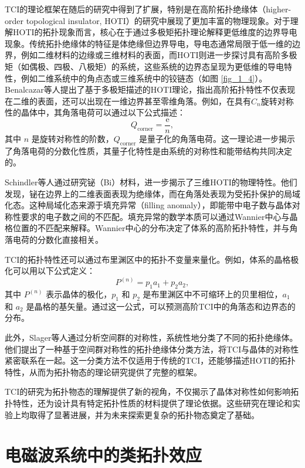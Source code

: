TCI的理论框架在随后的研究中得到了扩展，特别是在高阶拓扑绝缘体（higher-order topological insulator, HOTI）的研究中展现了更加丰富的物理现象\cite{f3}。对于理解HOTI的拓扑现象而言，核心在于通过多极矩拓扑理论解释更低维度的边界导电现象。传统拓扑绝缘体的特征是体绝缘但边界导电，导电态通常局限于低一维的边界，例如二维材料的边缘或三维材料的表面，而HOTI则进一步探讨具有高阶多极矩（如偶极、四极、八极矩）的系统，这些系统的边界态呈现为更低维的导电特性，例如二维系统中的角点态或三维系统中的铰链态（如图 \ref{fig_1_4}）。Benalcazar等人提出了基于多极矩描述的HOTI理论，指出高阶拓扑特性不仅表现在二维的表面，还可以出现在一维边界甚至零维角落。例如，在具有$C_n$旋转对称性的晶体中，其角落电荷可以通过以下公式描述：
\begin{equation} \label{eq1-8}
    Q_{\text{corner}} = \frac{\mathrm{e}}{n},
\end{equation}
其中 \(n\) 是旋转对称性的阶数，\(Q_{\text{corner}}\) 是量子化的角落电荷。这一理论进一步揭示了角落电荷的分数化性质，其量子化特性是由系统的对称性和能带结构共同决定的。

Schindler等人通过研究铋（Bi）材料，进一步揭示了三维HOTI的物理特性\cite{f4}。他们发现，铋在边界上的二维表面表现为绝缘体，而在角落处表现为受拓扑保护的局域化态。这种局域化态来源于填充异常（filling anomaly），即能带中电子数与晶体对称性要求的电子数之间的不匹配。填充异常的数学本质可以通过Wannier中心与晶格位置的不匹配来解释。Wannier中心的分布决定了体系的高阶拓扑特性，并与角落电荷的分数化直接相关。

TCI的拓扑特性还可以通过布里渊区中的拓扑不变量来量化。例如，体系的晶格极化可以用以下公式定义：
\begin{equation} \label{eq1-9}
    P^{(n)} = p_1 a_1 + p_2 a_2,
\end{equation}
其中 \(P^{(n)}\) 表示晶体的极化，\(p_1\) 和 \(p_2\) 是布里渊区中不可缩环上的贝里相位，\(a_1\) 和 \(a_2\) 是晶格的基矢量。通过这一公式，可以预测高阶TCI中的角落态和边界态的分布。

此外，Slager等人通过分析空间群的对称性，系统性地分类了不同的拓扑绝缘体\cite{f5}。他们提出了一种基于空间群对称性的拓扑绝缘体分类方法，将TCI与晶体的对称性紧密联系在一起。这一分类方法不仅适用于传统的TCI，还能够描述HOTI的拓扑特性，从而为拓扑物态的理论研究提供了完整的框架。

TCI的研究为拓扑物态的理解提供了新的视角，不仅揭示了晶体对称性如何影响拓扑特性，还为设计具有特定拓扑性质的材料提供了理论依据。这些研究在理论和实验上均取得了显著进展，并为未来探索更复杂的拓扑物态奠定了基础。 


\section{电磁波系统中的类拓扑效应}

